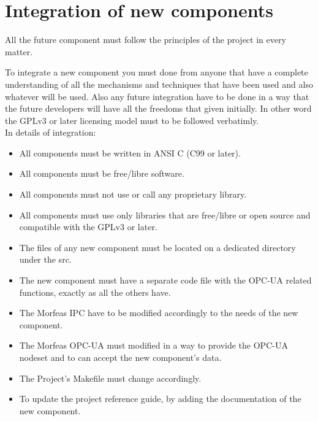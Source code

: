 \section{Integration of new components}
All the future component must follow the principles of the project in every matter.

To integrate a new component you must done from anyone that have a complete understanding of all the mechanisms and techniques that have been used and also whatever will be used.
Also any future integration have to be done in a way that the future developers will have all the freedoms that given initially.
In other word the GPLv3 or later licensing model must to be followed verbatimly.\\

In details of integration:
\begin{itemize}
	\item All components must be written in ANSI C (C99 or later).
	\item All components must be free/libre software.
	\item All components must not use or call any proprietary library.
	\item All components must use only libraries that are free/libre or open source and compatible with the GPLv3 or later.
	\item The files of any new component must be located on a dedicated directory under the src.
	\item The new component must have a separate code file with the OPC-UA related functions, exactly as all the others have.
	\item The Morfeas IPC have to be modified accordingly to the needs of the new component.
	\item The Morfeas OPC-UA must modified in a way to provide the OPC-UA nodeset and to can accept the new component's data.
	\item The Project's Makefile must change accordingly.
	\item To update the project reference guide, by adding the documentation of the new component.
\end{itemize}
